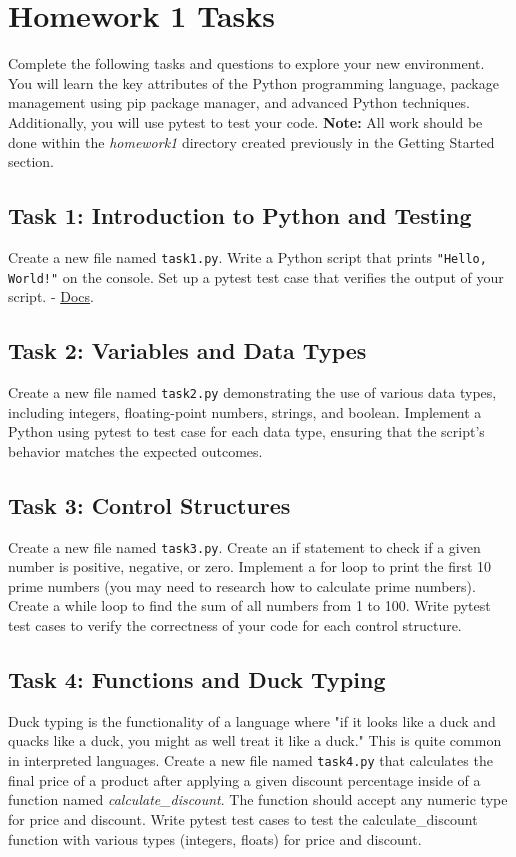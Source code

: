 \documentclass{article}
\begin{document}
\section{Homework 1 Tasks}
Complete the following tasks and questions to explore your new environment. You will learn the key attributes of the Python programming language, package management using pip package manager, and advanced Python techniques. Additionally, you will use pytest to test your code.
\newline\newline
\textbf{Note:} All work should be done within the \textit{homework1} directory created previously in the Getting Started section.

\subsection{Task 1: Introduction to Python and Testing}
Create a new file named \verb|task1.py|. Write a Python script that prints \verb|"Hello, World!"| on the console. Set up a pytest test case that verifies the output of your script. - \href{https://docs.pytest.org/en/stable/getting-started.html}{Docs}. 

\subsection{Task 2: Variables and Data Types}
Create a new file named \verb|task2.py| demonstrating the use of various data types, including integers, floating-point numbers, strings, and boolean. Implement a Python using pytest to test case for each data type, ensuring that the script's behavior matches the expected outcomes.

\subsection{Task 3: Control Structures}
Create a new file named \verb|task3.py|. Create an if statement to check if a given number is positive, negative, or zero. Implement a for loop to print the first 10 prime numbers (you may need to research how to calculate prime numbers). Create a while loop to find the sum of all numbers from 1 to 100. Write pytest test cases to verify the correctness of your code for each control structure.

\subsection{Task 4: Functions and Duck Typing}
Duck typing is the functionality of a language where "if it looks like a duck and quacks like a duck, you might as well treat it like a duck." This is quite common in interpreted languages. Create a new file named \verb|task4.py| that calculates the final price of a product after applying a given discount percentage inside of a function named \textit{calculate\_discount}. The function should accept any numeric type for price and discount. Write pytest test cases to test the calculate\_discount function with various types (integers, floats) for price and discount.
\end{document}

